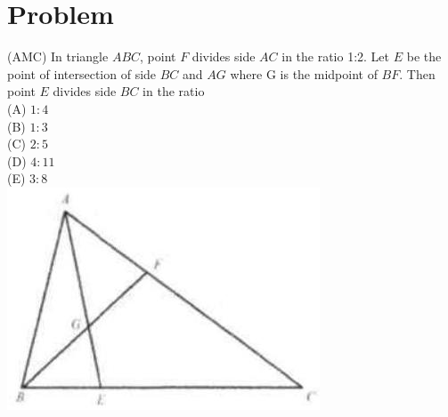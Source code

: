 \documentclass{article}
\begin{document}
\section*{Problem}
(AMC) In triangle \(A B C\), point \(F\) divides side \(A C\) in the ratio 1:2. Let \(E\) be the point of intersection of side \(B C\) and \(A G\) where G is the midpoint of \(B F\). Then point \(E\) divides side \(B C\) in the ratio\\
(A) \(1: 4\)\\
(B) \(1: 3\)\\
(C) \(2: 5\)\\
(D) \(4: 11\)\\
(E) \(3: 8\)\\
\centering
\includegraphics[width=\textwidth]{images/126.jpg}
\end{document}
